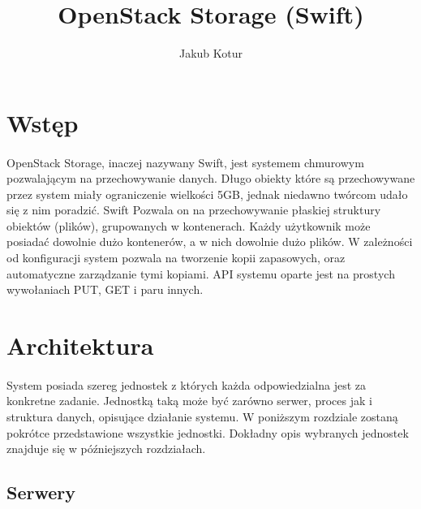 


\title{OpenStack Storage (Swift)}
\author{Jakub Kotur}



\maketitle

\section{Wstęp}
\paragraph{}

\nocite{openstack}

OpenStack Storage, inaczej nazywany Swift, jest systemem chmurowym pozwalającym na przechowywanie danych. Długo obiekty które są przechowywane przez system miały ograniczenie wielkości 5GB, jednak niedawno twórcom udało się z nim poradzić. Swift Pozwala on na przechowywanie płaskiej struktury obiektów (plików), grupowanych w kontenerach. Każdy użytkownik może posiadać dowolnie dużo kontenerów, a w nich dowolnie dużo plików. W zależności od konfiguracji system pozwala na tworzenie kopii zapasowych, oraz automatyczne zarządzanie tymi kopiami. API systemu oparte jest na prostych wywołaniach PUT, GET i paru innych.

\section{Architektura}\label{sec:architektura}
\paragraph{}

System posiada szereg jednostek z których każda odpowiedzialna jest za konkretne zadanie. Jednostką taką może być zarówno serwer, proces jak i struktura danych, opisujące działanie systemu. W poniższym rozdziale zostaną pokrótce przedstawione wszystkie jednostki. Dokładny opis wybranych jednostek znajduje się w późniejszych rozdziałach.

\subsection{Serwery}\label{sub:serwery}
